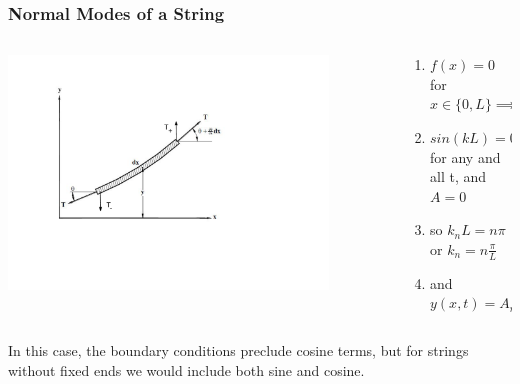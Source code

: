 \documentclass[pdf, handout, hideothersubsections]{beamer}
\begin{document}
\begin{frame}
\frametitle{Normal Modes of a String}
\begin{columns}

  \begin{column}{0.4\textwidth}
    \centering
    \includegraphics[width=0.85\textwidth]{StringForceDiagram.pdf}

  \end{column}

  \begin{column}{0.6\textwidth}
    \begin{enumerate}
    \item $f(x) = 0$ for $x \in \{0, L\} \implies$ \\
      \pause
    \item $sin(k L) = 0$ for any and all t, and $A = 0$\\
      \pause
    \item so $k_n L = n \pi$ or $k_n = n \frac{\pi}{L}$ \\
      \pause
    \item and $y(x, t) = A_n cos(\omega_n t) sin(k_n x)$ \\
    \end{enumerate}

  \end{column}

\end{columns}
\pause
In this case, the boundary conditions preclude cosine terms, but
for strings without fixed ends we would include both sine and cosine.

\end{frame}
\end{document}
